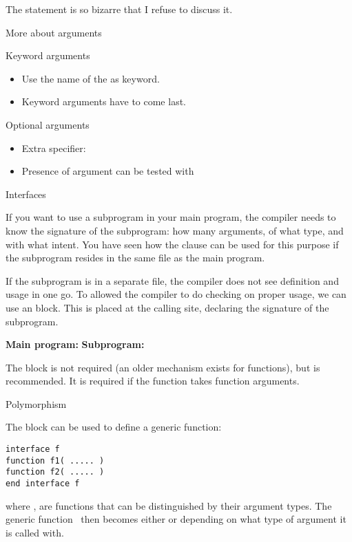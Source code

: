 The  statement is so bizarre that I refuse to discuss it.

 {More about arguments}

\begin{block}{Keyword arguments}
  \label{sl:funcf:keyword}
  \begin{itemize}
  \item Use the name of the  as
    keyword.
  \item Keyword arguments have to come last.
  \end{itemize}
\end{block}

\begin{block}{Optional arguments}
  \label{sl:funcf:optional}
  \begin{itemize}
  \item Extra specifier: 
  \item Presence of argument can be tested with 
  \end{itemize}
\end{block}

 {Interfaces}
\label{sec:finterface}

If you want to use a subprogram in your main program, the compiler
needs to know the signature of the subprogram: how many arguments, of
what type, and with what intent. You have seen how the
 clause can be used for this purpose if the
subprogram resides in the same file as the main program.

If the subprogram is in a separate file, the compiler does not see
definition and usage in one go. To allowed the compiler to do checking
on proper usage, we can use an  block. This
is placed at the calling site, declaring the signature of the
subprogram.

\begin{multicols}{2}
\textbf{Main program:}
\vfill\columnbreak
\textbf{Subprogram:}
\end{multicols}

The  block is not required (an older
 mechanism exists for functions), but is
recommended.
It is required if the function takes function arguments.

 {Polymorphism}

The  block can be used to define a generic
function:
\begin{lstlisting}
interface f
function f1( ..... )
function f2( ..... )
end interface f
\end{lstlisting}
where , are functions that can be distinguished by their
argument types. The generic function~ then becomes either 
or  depending on what type of argument it is called with.

